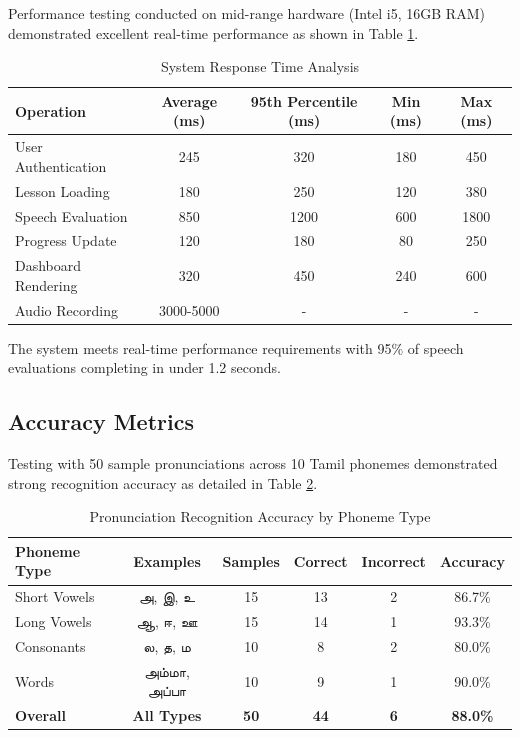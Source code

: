 \documentclass[12pt,a4paper]{article}
\begin{document}
Performance testing conducted on mid-range hardware (Intel i5, 16GB RAM) demonstrated excellent real-time performance as shown in Table \ref{tab:performance}.

\begin{table}[H]
\centering
\caption{System Response Time Analysis}
\label{tab:performance}
\begin{tabular}{lcccc}
\toprule
\textbf{Operation} & \textbf{Average (ms)} & \textbf{95th Percentile (ms)} & \textbf{Min (ms)} & \textbf{Max (ms)} \\
\midrule
User Authentication & 245 & 320 & 180 & 450 \\
Lesson Loading & 180 & 250 & 120 & 380 \\
Speech Evaluation & 850 & 1200 & 600 & 1800 \\
Progress Update & 120 & 180 & 80 & 250 \\
Dashboard Rendering & 320 & 450 & 240 & 600 \\
Audio Recording & 3000-5000 & - & - & - \\
\bottomrule
\end{tabular}
\end{table}

The system meets real-time performance requirements with 95\% of speech evaluations completing in under 1.2 seconds.

\subsection{Accuracy Metrics}

Testing with 50 sample pronunciations across 10 Tamil phonemes demonstrated strong recognition accuracy as detailed in Table \ref{tab:accuracy}.

\begin{table}[H]
\centering
\caption{Pronunciation Recognition Accuracy by Phoneme Type}
\label{tab:accuracy}
\begin{tabular}{lccccc}
\toprule
\textbf{Phoneme Type} & \textbf{Examples} & \textbf{Samples} & \textbf{Correct} & \textbf{Incorrect} & \textbf{Accuracy} \\
\midrule
Short Vowels & அ, இ, உ & 15 & 13 & 2 & 86.7\% \\
Long Vowels & ஆ, ஈ, ஊ & 15 & 14 & 1 & 93.3\% \\
Consonants & ல, த, ம & 10 & 8 & 2 & 80.0\% \\
Words & அம்மா, அப்பா & 10 & 9 & 1 & 90.0\% \\
\midrule
\textbf{Overall} & \textbf{All Types} & \textbf{50} & \textbf{44} & \textbf{6} & \textbf{88.0\%} \\
\bottomrule
\end{tabular}
\end{table}
\end{document}
